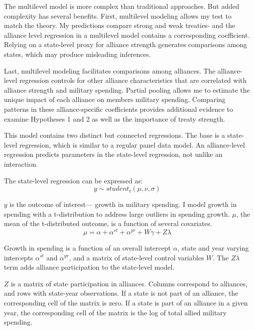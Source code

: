\documentclass[12pt]{article}
\begin{document}
The multilevel model is more complex than traditional approaches. 
But added complexity has several benefits. 
First, multilevel modeling allows my test to match the theory. 
My predictions compare strong and weak treaties- and the alliance level regression in a multilevel model contains a corresponding coefficient.
Relying on a state-level proxy for alliance strength generates comparisons among states, which may produce misleading inferences. 


Last, multilevel modeling facilitates comparisons among alliances. 
The alliance-level regression controls for other alliance characteristics that are correlated with alliance strength and military spending.
Partial pooling allows me to estimate the unique impact of each alliance on members military spending. 
Comparing patterns in these alliance-specific coefficients provides additional evidence to examine Hypotheses 1 and 2 as well as the importance of treaty strength. 


This model contains two distinct but connected regressions. 
The base is a state-level regression, which is similar to a regular panel data model.
An alliance-level regression predicts parameters in the state-level regression, not unlike an interaction. 

The state-level regression can be expressed as:
\begin{equation}
y \sim student_t(\mu, \nu, \sigma)
\end{equation}
 
$y$ is the outcome of interest--- growth in military spending. 
I model growth in spending with a t-distribution to address large outliers in spending growth. 
$\mu$, the mean of the t-distributed outcome, is a function of several covariates. 
\begin{equation}
\mu = \alpha + \alpha^{st} + \alpha^{yr} + W \gamma + Z \lambda
\end{equation}


Growth in spending is a function of an overall intercept $\alpha$, state and year varying intercepts $\alpha^{st}$ and $\alpha^{yr}$, and a matrix of state-level control variables $W$. 
The $Z \lambda$ term adds alliance participation to the state-level model.


$Z$ is a matrix of state participation in alliances. 
Columns correspond to alliances, and rows with state-year observations. 
If a state is not part of an alliance, the corresponding cell of the matrix is zero.
If a state is part of an alliance in a given year, the corresponding cell of the matrix is the log of total allied military spending. 
\end{document}

